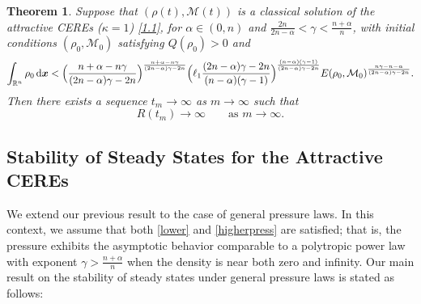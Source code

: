 \documentclass[reqno,11pt]{amsart}
\numberwithin{equation}{section}
\newtheorem{theorem}{Theorem}[section]
\theoremstyle{definition}
\def\dd{{\, \rm d}}
\begin{document}
\begin{theorem}\label{smallgamma}
Suppose that $(\rho(t),\mathcal{M}(t))$ is a classical solution of the attractive 
CEREs {\rm (}$\kappa = 1${\rm )} \eqref{1.1}, for $\alpha \in (0,n)$ and 
$\frac{2n}{2n - \alpha} < \gamma < \frac{n + \alpha}{n}$, 
with initial conditions $(\rho_0,\mathcal{M}_0)$ satisfying $Q(\rho_0) > 0$ and
    \begin{equation}\label{energymasscond}
  \int_{\mathbb{R}^n} \rho_0 \dd \boldsymbol{x} < \Big ( \frac{n + \alpha - n\gamma}{(2n-\alpha)\gamma - 2n} \Big )^\frac{n + \alpha - n\gamma}{(2n-\alpha)\gamma - 2n} \Big ( \ell_1 \frac{(2n-\alpha)\gamma - 2n}{(n - \alpha)(\gamma - 1)} \Big )^\frac{(n - \alpha)(\gamma - 1)}{(2n-\alpha)\gamma - 2n} E(\rho_0,\mathcal{M}_0)^\frac{n\gamma - n - \alpha}{(2n - \alpha)\gamma - 2n}.
    \end{equation}
Then there exists a sequence $t_m \to \infty$ as $m \to \infty$ such that
$$
R(t_m) \to \infty \qquad \mbox{as $m \to \infty$}.
$$
\end{theorem}

\smallskip
\subsection{Stability of Steady States for the Attractive CEREs}

We extend our previous result \cite[Theorem 2.6]{Carrillo2025} to the case of general pressure laws. 
In this context, we assume that both \eqref{lower} and \eqref{higherpress} are satisfied;
that is, the pressure exhibits the asymptotic behavior comparable to a polytropic power law with 
exponent $\gamma > \frac{n+\alpha}{n}$ when the density is near both zero and infinity. 
Our main result on the stability of steady states under general pressure laws is stated as
follows:
\end{document}
